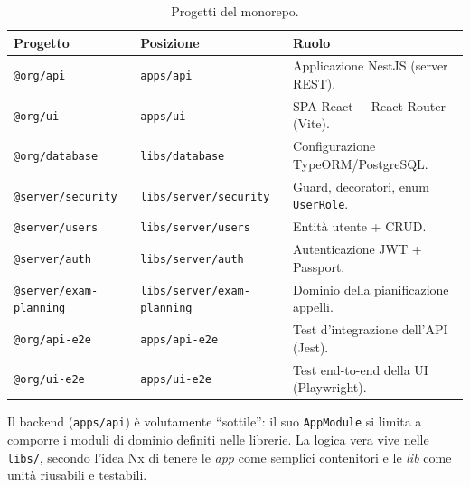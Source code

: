 \documentclass[11pt,a4paper,oneside]{report}
\newcommand{\code}[1]{\texttt{\small #1}}
\newcommand{\file}[1]{\texttt{\small #1}}
\begin{document}
\begin{table}[h]
\centering
\renewcommand{\arraystretch}{1.25}
\begin{tabularx}{\linewidth}{@{}llX@{}}
\toprule
\textbf{Progetto} & \textbf{Posizione} & \textbf{Ruolo} \\
\midrule
\code{@org/api}    & \file{apps/api}  & Applicazione NestJS (server REST). \\
\code{@org/ui}     & \file{apps/ui}   & SPA React + React Router (Vite). \\
\code{@org/database} & \file{libs/database} & Configurazione TypeORM/PostgreSQL. \\
\code{@server/security} & \file{libs/server/security} & Guard, decoratori, enum \code{UserRole}. \\
\code{@server/users} & \file{libs/server/users} & Entità utente + CRUD. \\
\code{@server/auth} & \file{libs/server/auth} & Autenticazione JWT + Passport. \\
\code{@server/exam-planning} & \file{libs/server/exam-planning} & Dominio della pianificazione appelli. \\
\code{@org/api-e2e} & \file{apps/api-e2e} & Test d'integrazione dell'API (Jest). \\
\code{@org/ui-e2e}  & \file{apps/ui-e2e}  & Test end-to-end della UI (Playwright). \\
\bottomrule
\end{tabularx}
\caption{Progetti del monorepo.}
\end{table}

Il backend (\code{apps/api}) è volutamente ``sottile'': il suo \code{AppModule}
si limita a comporre i moduli di dominio definiti nelle librerie. La logica vera
vive nelle \code{libs/}, secondo l'idea Nx di tenere le \emph{app} come semplici
contenitori e le \emph{lib} come unità riusabili e testabili.
\end{document}
